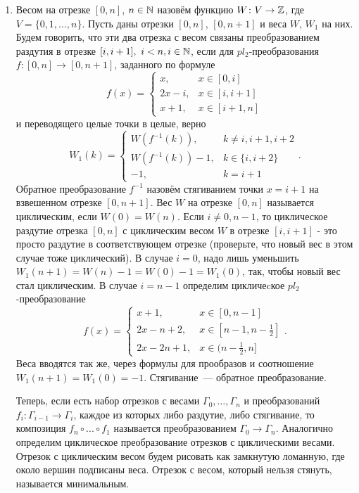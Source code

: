 \begin{enumerate}
\item Весом на отрезке $[0,n]$, $n\in\mathbb{N}$ назовём функцию $W\colon V\to\mathbb{Z}$, где $V=\{0, 1, \dots, n\}$. Пусть даны отрезки $[0,n]$, $[0,n+1]$ и веса $W$, $W_1$ на них. Будем говорить, что эти два отрезка с весом связаны преобразованием раздутия в отрезке  $[i,i+1],\,\, i<n, i\in\mathbb{N}$, если для $pl_2$-преобразования $f\colon [0,n] \to [0,n+1]$, заданного по формуле
$$f(x)=\begin{cases}
x,& x\in[0,i]\\
2x-i,& x\in[i,i+1]\\
x + 1,& x\in[i+1,n]
\end{cases}
$$
и переводящего целые точки в целые, верно
$$
W_1(k)=\begin{cases}
W(f^{-1}(k)),&  k\neq i, {i+1}, {i+2}\\
W(f^{-1}(k))-1,&  k\in\{i, i+2\}\\
-1,& k=i+1
\end{cases}.
$$
Обратное преобразование $f^{-1}$ назовём стягиванием точки $x=i+1$ на взвешенном отрезке $[0,n+1]$.
Вес $W$ на отрезке $[0,n]$ называется циклическим, если $W(0)=W(n)$. Если $i\neq 0,n-1$, то циклическое раздутие отрезка $[0,n]$ с циклическим весом $W$ в отрезке $[i,i+1]$ - это просто раздутие в соответствующем отрезке (проверьте, что новый вес в этом случае тоже циклический). В случае $i=0$, надо лишь уменьшить $W_1(n+1)=W(n)-1=W(0)-1=W_1(0)$, так, чтобы новый вес стал циклическим. В случае $i=n-1$ определим цикличеcкое $pl_2$-преобразование 
$$f(x)=\begin{cases}
x+1,& x\in[0,n-1]\\
2x-n+2,& x\in[n-1,n-\frac{1}{2}]\\
2x-2n+1,& x\in(n-\frac{1}{2},n]
\end{cases}.
$$
Веса вводятся так же, через формулы для прообразов и соотношение $W_1(n+1)=W_1(0)=-1$. Стягивание~— обратное преобразование.

 Теперь, если есть набор отрезков с весами  $\Gamma_0, \dots, \Gamma_n$ и преобразований $f_i\colon \Gamma_{i-1}\to\Gamma_{i}$, каждое из которых либо раздутие, либо стягивание, то композиция $f_n\circ ... \circ f_1$ называется преобразованием $\Gamma_0 \to \Gamma_n$. Аналогично определим циклическое преобразование отрезков с циклическими весами.
Отрезок с циклическим весом будем рисовать как замкнутую ломанную, где около вершин подписаны веса. 
Отрезок с весом, который нельзя стянуть, называется минимальным.


\end{enumerate}
